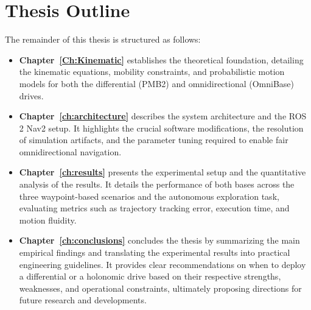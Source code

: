 \begin{itemize}
\end{itemize}

\section{Thesis Outline}

The remainder of this thesis is structured as follows:
\begin{itemize}
    \item \textbf{Chapter~\ref{Ch:Kinematic}} establishes the theoretical foundation, detailing the kinematic equations, mobility constraints, and probabilistic motion models for both the differential (PMB2) and omnidirectional (OmniBase) drives.
    \item \textbf{Chapter~\ref{ch:architecture}} describes the system architecture and the ROS 2 Nav2 setup. It highlights the crucial software modifications, the resolution of simulation artifacts, and the parameter tuning required to enable fair omnidirectional navigation.
    \item \textbf{Chapter~\ref{ch:results}} presents the experimental setup and the quantitative analysis of the results. It details the performance of both bases across the three waypoint-based scenarios and the autonomous exploration task, evaluating metrics such as trajectory tracking error, execution time, and motion fluidity.
    \item \textbf{Chapter~\ref{ch:conclusions}} concludes the thesis by summarizing the main empirical findings and translating the experimental results into practical engineering guidelines. It provides clear recommendations on when to deploy a differential or a holonomic drive based on their respective strengths, weaknesses, and operational constraints, ultimately proposing directions for future research and developments.
\end{itemize}


